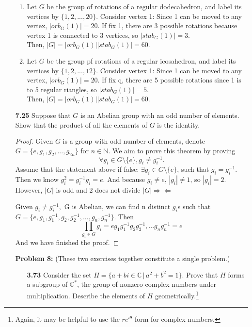 \documentclass[11pt, oneside]{article}
\newcommand{\N}{\mathbb N}
\newcommand{\C}{\mathbb C}
\begin{document}
\begin{enumerate}
\begin{enumerate}
\item Let $G$ be the group of rotations of a regular dodecahedron, and label its vertices by $\{1,2,...,20\}.$ Consider vertex 1: Since 1 can be moved to any vertex, $|orb_G(1)|=20.$ If fix 1, there are 3 possible rotations because vertex 1 is connected to 3 vertices, so $|stab_G(1)|= 3.$\\
Then, $|G|=|orb_G(1)||stab_G(1)|=60.$\\

\item Let $G$ be the group pf rotations of a regular icosahedron, and label its vertices by $\{1, 2,..., 12\}.$ Consider vertex 1: Since 1 can be moved to any vertex, $|orb_G(1)|=20.$ If fix q, there are 5 possible rotations since 1 is to 5 regular riangles, so $|stab_G(1)|= 5$.\\
Then, $|G|=|orb_G(1)||stab_G(1)|=60.$

\end{enumerate}



\newpage
\item[{\bf 7.25}] Suppose that $G$ is an Abelian group with an odd number of elements. Show that the product of all the elements of $G$ is the identity.
\begin{proof}

Given $G$ is a group with odd number of elements, denote $G = \{ e, g_1, g_2, ... ,g_{2n}\}$ for $n \in \N.$ We aim to prove this theorem by proving 
\[\forall  g_i \in G\setminus\{e\}, g_i \neq g_i^{-1}.\] 
Assume that the statement above if false: $\exists  g_i \in G\setminus\{e\}$, such that $g_i = g_i^{-1}$. Then we know $g_i^{2}=g_i^{-1}g_i=e$. And because $g_i\neq e$, $|g_i|\neq 1$, so $|g_i|=2.$ However, $|G|$ is odd and $2$ does not divide $|G| \Rightarrow\Leftarrow$

Given $g_i\neq g_i^{-1},$ G is Abelian, we can find n distinct $g_i$s such that $G = \{e, g_1, g_1^{-1}, g_2, g_2^{-1},..., g_n, g_n^{-1}\}.$ Then
\[\prod_{g_i\in G}g_i = eg_1g_1^{-1}g_2g_2^{-1},...g_ng_n^{-1} = e\]
And we have finished the proof.
\end{proof}
\newpage
\item[{\bf Problem 8:}] (These two exercises together constitute a single problem.)
\begin{enumerate}
\item[{\bf 3.73}] Consider the set $H = \{a+bi\in \C\,|\, a^2 + b^2 = 1\}$. Prove that $H$ forms a subgroup of $\C^*$, the group of nonzero complex numbers under multiplication.  Describe the elements of $H$ geometrically.\footnote{Again, it may be helpful to use the $re^{i\theta}$ form for complex numbers.}


\end{enumerate}
\end{enumerate}
\end{document}
